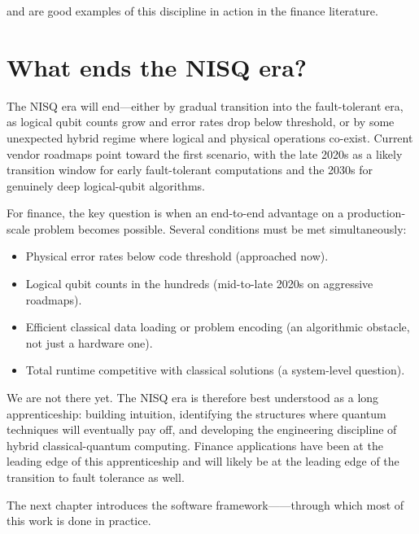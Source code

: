 \citet{morapakula_end--end_2026} and \citet{ciceri_enhanced_2025} are good examples of this discipline in action in the finance literature.

\section{What ends the NISQ era?}

The NISQ era will end---either by gradual transition into the fault-tolerant era, as logical qubit counts grow and error rates drop below threshold, or by some unexpected hybrid regime where logical and physical operations co-exist. Current vendor roadmaps point toward the first scenario, with the late 2020s as a likely transition window for early fault-tolerant computations and the 2030s for genuinely deep logical-qubit algorithms.

For finance, the key question is when an end-to-end advantage on a production-scale problem becomes possible. Several conditions must be met simultaneously:

\begin{itemize}
  \item Physical error rates below code threshold (approached now).
  \item Logical qubit counts in the hundreds (mid-to-late 2020s on aggressive roadmaps).
  \item Efficient classical data loading or problem encoding (an algorithmic obstacle, not just a hardware one).
  \item Total runtime competitive with classical solutions (a system-level question).
\end{itemize}

We are not there yet. The NISQ era is therefore best understood as a long apprenticeship: building intuition, identifying the structures where quantum techniques will eventually pay off, and developing the engineering discipline of hybrid classical-quantum computing. Finance applications have been at the leading edge of this apprenticeship and will likely be at the leading edge of the transition to fault tolerance as well.

The next chapter introduces the software framework------through which most of this work is done in practice.

\textsep

